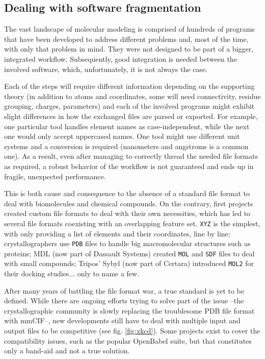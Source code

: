 \subsection{Dealing with software fragmentation}

The vast landscape of molecular modeling is comprised of hundreds of programs that have been developed to address different problems and, most of the time, with only that problem in mind. They were not designed to be part of a bigger, integrated workflow. Subsequently, good integration is needed between the involved software, which, unfortunately, it is not always the case.

Each of the steps will require different information depending on the supporting theory (in addition to atoms and coordinates, some will need connectivity, residue grouping, charges, parameters) and each of the involved programs might exhibit slight differences in how the exchanged files are parsed or exported. For example, one particular tool handles element names as case-independent, while the next one would only accept uppercased names. One tool might use different unit systems and a conversion is required (nanometers and angstroms is a common one). As a result, even after managing to correctly thread the needed file formats as required, a robust behavior of the workflow is not guaranteed and ends up in fragile, unexpected performance.

This is both cause and consequence to the absence of a standard file format to deal with biomolecules and chemical compounds. On the contrary, first projects created custom file formats to deal with their own necessities, which has led to several file formats coexisting with an overlapping feature set. \texttt{XYZ} is the simplest, with only providing a list of elements and their coordinates, line by line; crystallographers use \texttt{PDB} files to handle big macromolecular structures such as proteins; MDL (now part of Dassault Systems) created \texttt{MOL} and \texttt{SDF} files to deal with small compounds; Tripos’ Sybyl (now part of Certara) introduced \texttt{MOL2} for their docking studies$ \ldots $  only to name a few.

After many years of battling the file format war, a true standard is yet to be defined. While there are ongoing efforts trying to solve part of the issue --the crystallographic community is slowly replacing the troublesome PDB file format with mmCIF--,\cite{bourne1997,berman2007} new developments still have to deal with multiple input and output files to be competitive (see fig. \ref{fig:xkcd}). Some projects exist to cover the compatibility issues, such as the popular OpenBabel suite, \cite{oboyle2011} but that constitutes only a band-aid and not a true solution.

